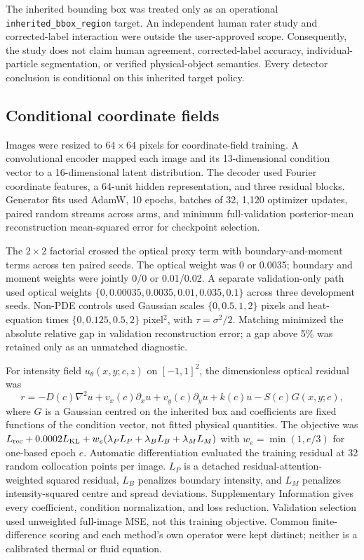 \documentclass[11pt]{article}
\begin{document}
The inherited bounding box was treated only as an operational \texttt{inherited\_bbox\_region} target. An independent human rater study and corrected-label interaction were outside the user-approved scope. Consequently, the study does not claim human agreement, corrected-label accuracy, individual-particle segmentation, or verified physical-object semantics. Every detector conclusion is conditional on this inherited target policy.

\subsection{Conditional coordinate fields}
Images were resized to $64\times64$ pixels for coordinate-field training. A convolutional encoder mapped each image and its 13-dimensional condition vector to a 16-dimensional latent distribution. The decoder used Fourier coordinate features, a 64-unit hidden representation, and three residual blocks. Generator fits used AdamW, 10 epochs, batches of 32, 1,120 optimizer updates, paired random streams across arms, and minimum full-validation posterior-mean reconstruction mean-squared error for checkpoint selection.

The $2\times2$ factorial crossed the optical proxy term with boundary-and-moment terms across ten paired seeds. The optical weight was 0 or 0.0035; boundary and moment weights were jointly 0/0 or 0.01/0.02. A separate validation-only path used optical weights $\{0,0.00035,0.0035,0.01,0.035,0.1\}$ across three development seeds. Non-PDE controls used Gaussian scales $\{0,0.5,1,2\}$ pixels and heat-equation times $\{0,0.125,0.5,2\}$ pixel$^2$, with $\tau=\sigma^2/2$. Matching minimized the absolute relative gap in validation reconstruction error; a gap above 5\% was retained only as an unmatched diagnostic.

For intensity field $u_\theta(x,y;c,z)$ on $[-1,1]^2$, the dimensionless optical residual was
\[
r=-D(c)\nabla^2u+v_x(c)\partial_xu+v_y(c)\partial_yu+k(c)u-S(c)G(x,y;c),
\]
where $G$ is a Gaussian centred on the inherited box and coefficients are fixed functions of the condition vector, not fitted physical quantities. The objective was $L_{\rm rec}+0.0002L_{\rm KL}+w_e(\lambda_PL_P+\lambda_BL_B+\lambda_ML_M)$ with $w_e=\min(1,e/3)$ for one-based epoch $e$. Automatic differentiation evaluated the training residual at 32 random collocation points per image. $L_P$ is a detached residual-attention-weighted squared residual, $L_B$ penalizes boundary intensity, and $L_M$ penalizes intensity-squared centre and spread deviations. Supplementary Information gives every coefficient, condition normalization, and loss reduction. Validation selection used unweighted full-image MSE, not this training objective. Common finite-difference scoring and each method's own operator were kept distinct; neither is a calibrated thermal or fluid equation.
\end{document}
